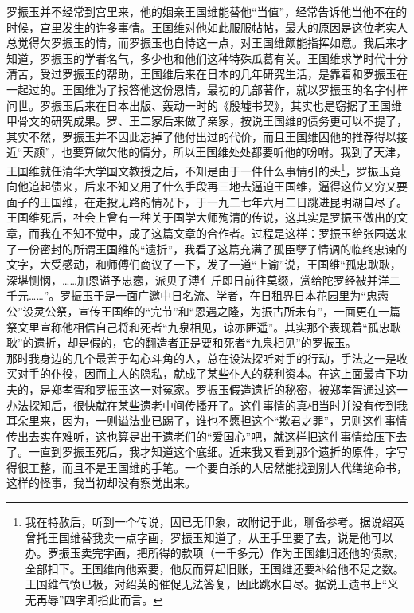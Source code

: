 罗振玉并不经常到宫里来，他的姻亲王国维能替他“当值”，经常告诉他当他不在的时候，宫里发生的许多事情。王国维对他如此服服帖帖，最大的原因是这位老实人总觉得欠罗振玉的情，而罗振玉也自恃这一点，对王国维颇能指挥如意。我后来才知道，罗振玉的学者名气，多少也和他们这种特殊瓜葛有关。王国维求学时代十分清苦，受过罗振玉的帮助，王国维后来在日本的几年研究生活，是靠着和罗振玉在一起过的。王国维为了报答他这份恩情，最初的几部著作，就以罗振玉的名字付梓问世。罗振玉后来在日本出版、轰动一时的《殷墟书契》，其实也是窃据了王国维甲骨文的研究成果。罗、王二家后来做了亲家，按说王国维的债务更可以不提了，其实不然，罗振玉并不因此忘掉了他付出过的代价，而且王国维因他的推荐得以接近“天颜”，也要算做欠他的情分，所以王国维处处都要听他的吩咐。我到了天津，王国维就任清华大学国文教授之后，不知是由于一件什么事情引的头\footnote{我在特赦后，听到一个传说，因已无印象，故附记于此，聊备参考。据说绍英曾托王国维替我卖一点字画，罗振玉知道了，从王手里要了去，说是他可以办。罗振玉卖完字画，把所得的款项（一千多元）作为王国维归还他的债款，全部扣下。王国维向他索要，他反而算起旧账，王国维还要补给他不足之数。王国维气愤已极，对绍英的催促无法答复，因此跳水自尽。据说王遗书上“义无再辱”四字即指此而言。}，罗振玉竟向他追起债来，后来不知又用了什么手段再三地去逼迫王国维，逼得这位又穷又要面子的王国维，在走投无路的情况下，于一九二七年六月二日跳进昆明湖自尽了。\\

王国维死后，社会上曾有一种关于国学大师殉清的传说，这其实是罗振玉做出的文章，而我在不知不觉中，成了这篇文章的合作者。过程是这样：罗振玉给张园送来了一份密封的所谓王国维的“遗折”，我看了这篇充满了孤臣孽子情调的临终忠谏的文字，大受感动，和师傅们商议了一下，发了一道“上谕”说，王国维“孤忠耿耿，深堪恻悯，……加恩谥予忠悫，派贝子溥亻斤即日前往莫缀，赏给陀罗经被并洋二千元……”。罗振玉于是一面广邀中日名流、学者，在日租界日本花园里为“忠悫公”设灵公祭，宣传王国维的“完节”和“恩遇之隆，为振古所未有”，一面更在一篇祭文里宣称他相信自己将和死者“九泉相见，谅亦匪遥”。其实那个表现着“孤忠耿耿”的遗折，却是假的，它的翻造者正是要和死者“九泉相见”的罗振玉。\\

那时我身边的几个最善于勾心斗角的人，总在设法探听对手的行动，手法之一是收买对手的仆役，因而主人的隐私，就成了某些仆人的获利资本。在这上面最肯下功夫的，是郑孝胥和罗振玉这一对冤家。罗振玉假造遗折的秘密，被郑孝胥通过这一办法探知后，很快就在某些遗老中间传播开了。这件事情的真相当时并没有传到我耳朵里来，因为，一则谥法业已踢了，谁也不愿担这个“欺君之罪”，另则这件事情传出去实在难听，这也算是出于遗老们的“爱国心”吧，就这样把这件事情给压下去了。一直到罗振玉死后，我才知道这个底细。近来我又看到那个遗折的原件，字写得很工整，而且不是王国维的手笔。一个要自杀的人居然能找到别人代缮绝命书，这样的怪事，我当初却没有察觉出来。\\

